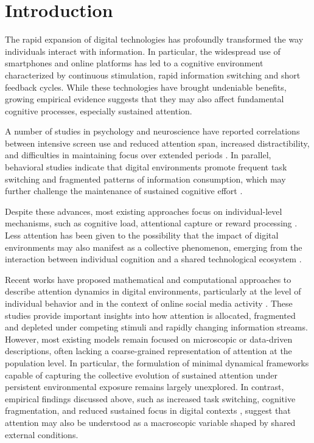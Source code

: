 \documentclass[preprint,12pt]{elsarticle}
\begin{document}






\section{Introduction}


The rapid expansion of digital technologies has profoundly transformed the way individuals interact with information. In particular, the widespread use of smartphones and online platforms has led to a cognitive environment characterized by continuous stimulation, rapid information switching and short feedback cycles. While these technologies have brought undeniable benefits, growing empirical evidence suggests that they may also affect fundamental cognitive processes, especially sustained attention.

A number of studies in psychology and neuroscience have reported correlations between intensive screen use and reduced attention span, increased distractibility, and difficulties in maintaining focus over extended periods \cite{Twenge,mark1,mark2,mark3,gazzaley}. In parallel, behavioral studies indicate that digital environments promote frequent task switching and fragmented patterns of information consumption, which may further challenge the maintenance of sustained cognitive effort \cite{mark1,ophir,leroy}.

Despite these advances, most existing approaches focus on individual-level mechanisms, such as cognitive load, attentional capture or reward processing \cite{gazzaley,kahneman}. Less attention has been given to the possibility that the impact of digital environments may also manifest as a collective phenomenon, emerging from the interaction between individual cognition and a shared technological ecosystem \cite{rmp}.

Recent works have proposed mathematical and computational approaches to describe attention dynamics in digital environments, particularly at the level of individual behavior and in the context of online social media activity \cite{vacaruiz,ojer}. These studies provide important insights into how attention is allocated, fragmented and depleted under competing stimuli and rapidly changing information streams. However, most existing models remain focused on microscopic or data-driven descriptions, often lacking a coarse-grained representation of attention at the population level. In particular, the formulation of minimal dynamical frameworks capable of capturing the collective evolution of sustained attention under persistent environmental exposure remains largely unexplored. In contrast, empirical findings discussed above, such as increased task switching, cognitive fragmentation, and reduced sustained focus in digital contexts \cite{Twenge,mark1,mark2,mark3,gazzaley}, suggest that attention may also be understood as a macroscopic variable shaped by shared external conditions.
\end{document}
